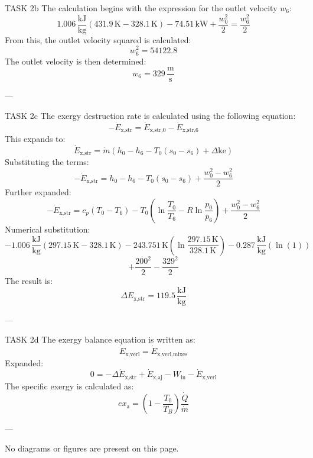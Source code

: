 TASK 2b  
The calculation begins with the expression for the outlet velocity \( w_6 \):  
\[
1.006 \, \frac{\text{kJ}}{\text{kg}} \left( 431.9 \, \text{K} - 328.1 \, \text{K} \right) - 74.51 \, \text{kW} + \frac{w_0^2}{2} = \frac{w_6^2}{2}
\]  
From this, the outlet velocity squared is calculated:  
\[
w_6^2 = 54122.8
\]  
The outlet velocity is then determined:  
\[
w_6 = 329 \, \frac{\text{m}}{\text{s}}
\]  

---

TASK 2c  
The exergy destruction rate is calculated using the following equation:  
\[
-\dot{E}_{\text{x,str}} = \dot{E}_{\text{x,str,0}} - \dot{E}_{\text{x,str,6}}
\]  
This expands to:  
\[
\dot{E}_{\text{x,str}} = \dot{m} \left( h_0 - h_6 - T_0 \left( s_0 - s_6 \right) + \Delta \text{ke} \right)
\]  
Substituting the terms:  
\[
-\dot{E}_{\text{x,str}} = h_0 - h_6 - T_0 \left( s_0 - s_6 \right) + \frac{w_0^2 - w_6^2}{2}
\]  
Further expanded:  
\[
-\dot{E}_{\text{x,str}} = c_p \left( T_0 - T_6 \right) - T_0 \left( \ln \frac{T_0}{T_6} - R \ln \frac{p_0}{p_6} \right) + \frac{w_0^2 - w_6^2}{2}
\]  
Numerical substitution:  
\[
-1.006 \, \frac{\text{kJ}}{\text{kg}} \left( 297.15 \, \text{K} - 328.1 \, \text{K} \right) - 243.751 \, \text{K} \left( \ln \frac{297.15 \, \text{K}}{328.1 \, \text{K}} \right) - 0.287 \, \frac{\text{kJ}}{\text{kg}} \left( \ln(1) \right)
\]  
\[
+ \frac{200^2}{2} - \frac{329^2}{2}
\]  
The result is:  
\[
\Delta E_{\text{x,str}} = 119.5 \, \frac{\text{kJ}}{\text{kg}}
\]  

---

TASK 2d  
The exergy balance equation is written as:  
\[
\dot{E}_{\text{x,verl}} = \dot{E}_{\text{x,verl,mixes}}
\]  
Expanded:  
\[
0 = -\Delta \dot{E}_{\text{x,str}} + \dot{E}_{\text{x,aj}} - W_{\text{in}} - \dot{E}_{\text{x,verl}}
\]  
The specific exergy is calculated as:  
\[
ex_{\text{a}} = \left( 1 - \frac{T_0}{T_B} \right) \frac{\dot{Q}}{\dot{m}}
\]  

---

No diagrams or figures are present on this page.